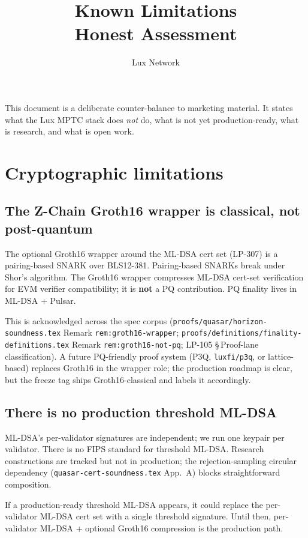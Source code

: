 \documentclass[11pt]{article}
\title{Known Limitations\\\large Honest Assessment}
\author{Lux Network}
\date{}
\begin{document}
\maketitle

This document is a deliberate counter-balance to marketing material. It states
what the Lux MPTC stack does \emph{not} do, what is not yet production-ready,
what is research, and what is open work.

\section{Cryptographic limitations}

\subsection{The Z-Chain Groth16 wrapper is classical, not post-quantum}

The optional Groth16 wrapper around the ML-DSA cert set (LP-307) is a
pairing-based SNARK over BLS12-381. Pairing-based SNARKs break under Shor's
algorithm. The Groth16 wrapper compresses ML-DSA cert-set verification for
EVM verifier compatibility; it is \textbf{not} a PQ contribution. PQ finality
lives in ML-DSA + Pulsar.

This is acknowledged across the spec corpus
(\verb|proofs/quasar/horizon-soundness.tex| Remark \verb|rem:groth16-wrapper|;
\verb|proofs/definitions/finality-definitions.tex| Remark
\verb|rem:groth16-not-pq|; LP-105 \S\,Proof-lane classification). A future
PQ-friendly proof system (P3Q, \texttt{luxfi/p3q}, or lattice-based) replaces Groth16 in the
wrapper role; the production roadmap is clear, but the freeze tag ships
Groth16-classical and labels it accordingly.

\subsection{There is no production threshold ML-DSA}

ML-DSA's per-validator signatures are independent; we run one keypair per
validator. There is no FIPS standard for threshold ML-DSA. Research
constructions are tracked but not in production; the rejection-sampling
circular dependency (\verb|quasar-cert-soundness.tex| App.~A) blocks
straightforward composition.

If a production-ready threshold ML-DSA appears, it could replace the
per-validator ML-DSA cert set with a single threshold signature. Until then,
per-validator ML-DSA + optional Groth16 compression is the production path.
\end{document}
